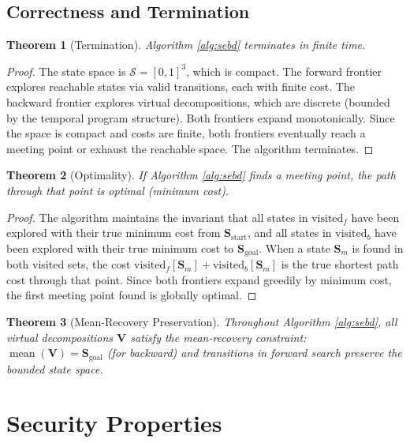 \documentclass[twocolumn,11pt,a4paper]{article}
\newtheorem{theorem}{Theorem}[section]
\newcommand{\Stuple}{\mathbf{S}}
\newcommand{\calS}{\mathcal{S}}
\DeclareMathOperator{\mean}{mean}
\begin{document}
\subsection{Correctness and Termination}

\begin{theorem}[Termination]
Algorithm \ref{alg:sebd} terminates in finite time.
\end{theorem}

\begin{proof}
The state space is $\calS = [0,1]^3$, which is compact. The forward frontier explores reachable states via valid transitions, each with finite cost. The backward frontier explores virtual decompositions, which are discrete (bounded by the temporal program structure). Both frontiers expand monotonically. Since the space is compact and costs are finite, both frontiers eventually reach a meeting point or exhaust the reachable space. The algorithm terminates.
\end{proof}

\begin{theorem}[Optimality]
If Algorithm \ref{alg:sebd} finds a meeting point, the path through that point is optimal (minimum cost).
\end{theorem}

\begin{proof}
The algorithm maintains the invariant that all states in $\text{visited}_f$ have been explored with their true minimum cost from $\Stuple_{\text{start}}$, and all states in $\text{visited}_b$ have been explored with their true minimum cost to $\Stuple_{\text{goal}}$. When a state $\Stuple_m$ is found in both visited sets, the cost $\text{visited}_f[\Stuple_m] + \text{visited}_b[\Stuple_m]$ is the true shortest path cost through that point. Since both frontiers expand greedily by minimum cost, the first meeting point found is globally optimal.
\end{proof}

\begin{theorem}[Mean-Recovery Preservation]
Throughout Algorithm \ref{alg:sebd}, all virtual decompositions $\mathbf{V}$ satisfy the mean-recovery constraint: $\mean(\mathbf{V}) = \Stuple_{\text{goal}}$ (for backward) and transitions in forward search preserve the bounded state space.
\end{theorem}

\section{Security Properties}
\label{sec:security}
\end{document}
